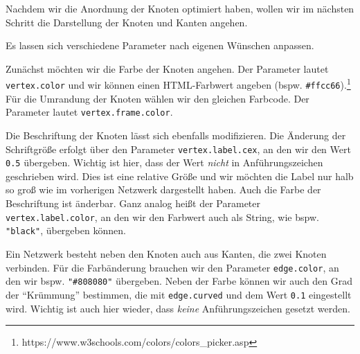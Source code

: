 \documentclass[11pt]{article}
\begin{document}
Nachdem wir die Anordnung der Knoten optimiert haben, wollen wir im
nächsten Schritt die Darstellung der Knoten und Kanten angehen.

Es lassen sich verschiedene Parameter nach eigenen Wünschen anpassen.

Zunächst möchten wir die Farbe der Knoten angehen. Der Parameter lautet
\texttt{vertex.color} und wir können einen HTML-Farbwert angeben (bspw.
\texttt{\#ffcc66}).\footnote{https://www.w3schools.com/colors/colors\_picker.asp}
Für die Umrandung der Knoten wählen wir den gleichen Farbcode. Der
Parameter lautet \texttt{vertex.frame.color}.

Die Beschriftung der Knoten lässt sich ebenfalls modifizieren. Die
Änderung der Schriftgröße erfolgt über den Parameter
\texttt{vertex.label.cex}, an den wir den Wert \texttt{0.5} übergeben.
Wichtig ist hier, dass der Wert \emph{nicht} in Anführungszeichen
geschrieben wird. Dies ist eine relative Größe und wir möchten die Label
nur halb so groß wie im vorherigen Netzwerk dargestellt haben. Auch die
Farbe der Beschriftung ist änderbar. Ganz analog heißt der Parameter
\texttt{vertex.label.color}, an den wir den Farbwert auch als String,
wie bspw. \texttt{"black"}, übergeben können.

Ein Netzwerk besteht neben den Knoten auch aus Kanten, die zwei Knoten
verbinden. Für die Farbänderung brauchen wir den Parameter
\texttt{edge.color}, an den wir bspw. \texttt{"\#808080"} übergeben.
Neben der Farbe können wir auch den Grad der ``Krümmung'' bestimmen, die
mit \texttt{edge.curved} und dem Wert \texttt{0.1} eingestellt wird.
Wichtig ist auch hier wieder, dass \emph{keine} Anführungszeichen
gesetzt werden.
\end{document}
